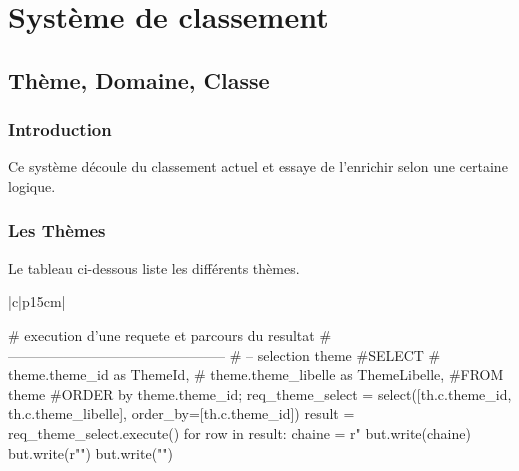 \documentclass[12pt,titlepage]{book}
\begin{document}
\mainmatter

\part{Système de classement}

\chapter{Thème, Domaine, Classe}

\section{Introduction}
Ce système découle du classement actuel et essaye de l'enrichir selon une certaine logique.

\section{Les Thèmes}
Le tableau ci-dessous liste les différents thèmes.
\vspace{\baselineskip}

\renewcommand{\arraystretch}{1.2}
\begin{supertabular}{|c|p{15cm}|}

\begin{lbdpython}
# execution d'une requete et parcours du resultat
# -----------------------------------------------
# -- selection theme
#SELECT
#   theme.theme_id as ThemeId,
#   theme.theme_libelle as ThemeLibelle,
#FROM theme
#ORDER by theme.theme_id;
req_theme_select = select([th.c.theme_id, th.c.theme_libelle],
                           order_by=[th.c.theme_id])
result = req_theme_select.execute()
for row in result:
  chaine = r"%
  but.write(chaine)
  but.write(r"\hline")
  but.write("\n")

\end{lbdpython}
\end{supertabular}
\end{document}
